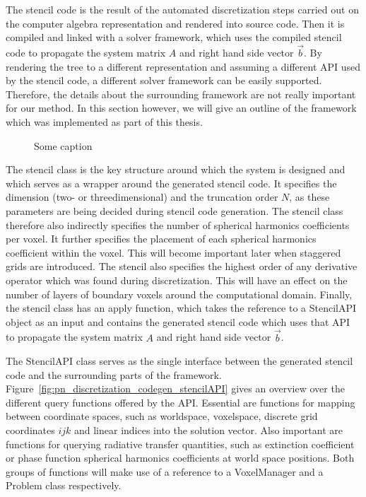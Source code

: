The stencil code is the result of the automated discretization steps carried out on the computer algebra representation and rendered into source code. Then it is compiled and linked with a solver framework, which uses the compiled stencil code to propagate the system matrix $A$ and right hand side vector $\vec{b}$. By rendering the tree to a different representation and assuming a different API used by the stencil code, a different solver framework can be easily supported.
Therefore, the details about the surrounding framework are not really important for our method. In this section however, we will give an outline of the framework which was implemented as part of this thesis.
\begin{figure}[h]
\centering
{}
\caption{Some caption}
\label{fig:pn_classes}
\end{figure}

The stencil class is the key structure around which the system is designed and which serves as a wrapper around the generated stencil code. It specifies the dimension (two- or threedimensional) and the truncation order $N$, as these parameters are being decided during stencil code generation. The stencil class therefore also indirectly specifies the number of spherical harmonics coefficients per voxel. It further specifies the placement of each spherical harmonics coefficient within the voxel. This will become important later when staggered grids are introduced. The stencil also specifies the highest order of any derivative operator which was found during discretization. This will have an effect on the number of layers of boundary voxels around the computational domain. Finally, the stencil class has an apply function, which takes the reference to a StencilAPI object as an input and contains the generated stencil code which uses that API to propagate the system matrix $A$ and right hand side vector $\vec{b}$.

The StencilAPI class serves as the single interface between the generated stencil code and the surrounding parts of the framework. Figure~\ref{fig:pn_discretization_codegen_stencilAPI} gives an overview over the different query functions offered by the API. Essential are functions for mapping between coordinate spaces, such as worldspace, voxelspace, discrete grid coordinates $ijk$ and linear indices into the solution vector. Also important are functions for querying radiative transfer quantities, such as extinction coefficient or phase function spherical harmonics coefficients at world space positions. Both groups of functions will make use of a reference to a VoxelManager and a Problem class respectively.

